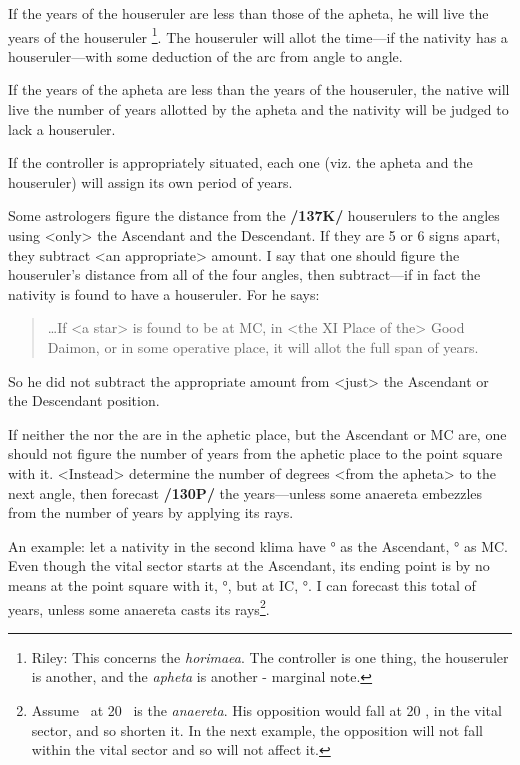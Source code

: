 If the years of the houseruler are less than those of the apheta, he will live the years of the houseruler
\footnote{Riley: This concerns the \textsl{horimaea}. The controller is one thing, the houseruler is another, and the \textsl{apheta} is
another - marginal note.}. The houseruler will allot the time—if the nativity has a houseruler—with some deduction of the arc from angle to angle. 

If the years of the apheta are less than the years of the houseruler, the native will live the number of years allotted by the apheta and the nativity will be judged to lack a houseruler. 

If the controller is appropriately situated, each one (viz. the apheta and the houseruler) will assign its own period of years.

Some astrologers figure the distance from the \textbf{/137K/} houserulers to the angles using <only> the Ascendant and the Descendant. If they are 5 or 6 signs apart, they subtract <an appropriate> amount. I say that one should figure the houseruler’s distance from all of the four angles, then subtract—if in fact the nativity is found to have a houseruler. For he says: 
\begin{quote}\ldots If <a star> is found to be at MC, in <the XI Place of the> Good Daimon, or in some operative place, it will allot the full span of years.
\end{quote}

So he did not subtract the appropriate amount from <just> the Ascendant or the Descendant position. 

If neither the \Sun\xspace nor the \Moon\xspace are in the aphetic place, but the Ascendant or MC are, one should not figure the number of years from the aphetic place to the point square with it. <Instead> determine the number of degrees <from the apheta> to the next angle, then forecast \textbf{/130P/} the years—unless some anaereta embezzles from the number of years by applying its rays.

An example: let a nativity in the second klima have \Gemini\xspace 8° as the Ascendant, \Aquarius\xspace 22° as MC. Even though the vital sector starts at the Ascendant, its ending point is by no means at the point square with it, \Virgo\xspace 8°, but at IC, \Leo\xspace 22°. I can forecast this total of years, unless some anaereta casts its rays\footnote{Assume \Mars\, at 20 \Capricorn\, is the \textsl{anaereta}. His opposition would fall at 20 \Cancer, in the vital sector, and so shorten it. In the next example, the opposition will not fall within the vital sector and so will not affect it.}. 

